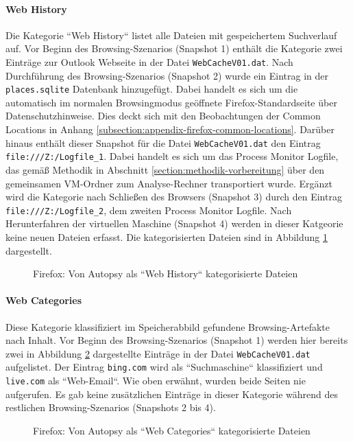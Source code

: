\begin{appendices}
\paragraph*{Web History}
Die Kategorie ``Web History`` listet alle Dateien mit gespeichertem Suchverlauf auf. Vor Beginn des Browsing-Szenarios (Snapshot 1) enthält die Kategorie zwei Einträge zur Outlook Webseite in der Datei \texttt{WebCacheV01.dat}. Nach Durchführung des Browsing-Szenarios (Snapshot 2) wurde ein Eintrag in der \texttt{places.sqlite} Datenbank hinzugefügt. Dabei handelt es sich um die automatisch im normalen Browsingmodus geöffnete Firefox-Standardseite über Datenschutzhinweise. Dies deckt sich mit den Beobachtungen der Common Locations in Anhang \ref{subsection:appendix-firefox-common-locations}. Darüber hinaus enthält dieser Snapshot für die Datei \texttt{WebCacheV01.dat} den Eintrag \texttt{file:///Z:/Logfile\_1}. Dabei handelt es sich um das Process Monitor Logfile, das gemäß Methodik in Abschnitt \ref{section:methodik-vorbereitung} über den gemeinsamen VM-Ordner zum Analyse-Rechner transportiert wurde. Ergänzt wird die Kategorie nach Schließen des Browsers (Snapshot 3) durch den Eintrag \texttt{file:///Z:/Logfile\_2}, dem zweiten Process Monitor Logfile. Nach Herunterfahren der virtuellen Maschine (Snapshot 4) werden in dieser Katgeorie keine neuen Dateien erfasst. Die kategorisierten Dateien sind in Abbildung \ref{img:firefox-web-history} dargestellt.
\begin{figure}[h!]
	\centerline{}
	\caption{Firefox: Von Autopsy als ``Web History`` kategorisierte Dateien}
	\label{img:firefox-web-history}  
\end{figure}

\paragraph*{Web Categories}
Diese Kategorie klassifiziert im Speicherabbild gefundene Browsing-Artefakte nach Inhalt.
Vor Beginn des Browsing-Szenarios (Snapshot 1) werden hier bereits zwei in Abbildung \ref{img:firefox-web-categories} dargestellte Einträge in der Datei \texttt{WebCacheV01.dat} aufgelistet. Der Eintrag \texttt{bing.com} wird als ``Suchmaschine`` klassifiziert und \texttt{live.com} als ``Web-Email``.
Wie oben erwähnt, wurden beide Seiten nie aufgerufen. Es gab keine zusätzlichen Einträge in dieser Kategorie während des restlichen Browsing-Szenarios (Snapshots 2 bis 4).
\begin{figure}[h!]
	\centerline{}
	\caption{Firefox: Von Autopsy als ``Web Categories`` kategorisierte Dateien}
	\label{img:firefox-web-categories}  
\end{figure}


\end{appendices}
